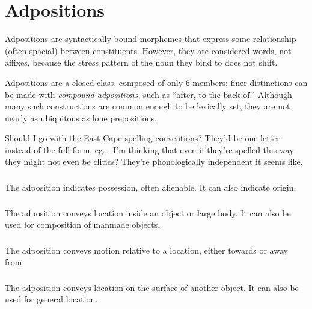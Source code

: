 \setchapterpreamble[u]{\margintoc}
\chapter{Adpositions}
Adpositions are syntactically bound morphemes that express some relationship (often spacial) between constituents. However, they are considered words, not affixes, because the stress pattern of the noun they bind to does not shift.  %

Adpositions are a closed class, composed of only 6 members; finer distinctions can be made with \emph{compound adpositions}, such as  “after, to the back of.” Although many such constructions are common enough to be lexically set, they are not nearly as ubiquitous as lone prepositions.

\begin{kaobox}[frametitle=\sc todo:]
    Should I go with the East Cape spelling conventions? They'd be one letter instead of the full form, eg. . I'm thinking that even if they're spelled this way they might not even be clitics? They're phonologically independent it seems like.
\end{kaobox}

\subsection{}
The adposition  indicates possession, often alienable. It can also indicate origin. 

\subsection{}
The adposition  conveys location inside an object or large body. It can also be used for composition of manmade objects.

\subsection{}
The adposition  conveys motion relative to a location, either towards or away from.

\subsection{}
The adposition  conveys location on the surface of another object. It can also be used for general location.


